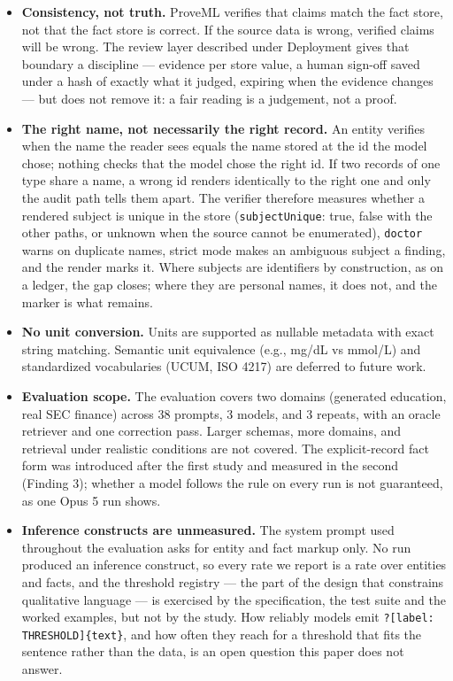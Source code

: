 \documentclass[11pt,a4paper]{article}
\begin{document}
\begin{itemize}[nosep]
    \item \textbf{Consistency, not truth.} ProveML verifies that claims match the fact store, not that the fact store is correct. If the source data is wrong, verified claims will be wrong. The review layer described under Deployment gives that boundary a discipline --- evidence per store value, a human sign-off saved under a hash of exactly what it judged, expiring when the evidence changes --- but does not remove it: a fair reading is a judgement, not a proof.
    \item \textbf{The right name, not necessarily the right record.} An entity verifies when the name the reader sees equals the name stored at the id the model chose; nothing checks that the model chose the right id. If two records of one type share a name, a wrong id renders identically to the right one and only the audit path tells them apart. The verifier therefore measures whether a rendered subject is unique in the store (\texttt{subjectUnique}: true, false with the other paths, or unknown when the source cannot be enumerated), \texttt{doctor} warns on duplicate names, strict mode makes an ambiguous subject a finding, and the render marks it. Where subjects are identifiers by construction, as on a ledger, the gap closes; where they are personal names, it does not, and the marker is what remains.
    \item \textbf{No unit conversion.} Units are supported as nullable metadata with exact string matching. Semantic unit equivalence (e.g., mg/dL vs mmol/L) and standardized vocabularies (UCUM, ISO 4217) are deferred to future work.
    \item \textbf{Evaluation scope.} The evaluation covers two domains (generated education, real SEC finance) across 38 prompts, 3 models, and 3 repeats, with an oracle retriever and one correction pass. Larger schemas, more domains, and retrieval under realistic conditions are not covered. The explicit-record fact form was introduced after the first study and measured in the second (Finding 3); whether a model follows the rule on every run is not guaranteed, as one Opus 5 run shows.
    \item \textbf{Inference constructs are unmeasured.} The system prompt used throughout the evaluation asks for entity and fact markup only. No run produced an inference construct, so every rate we report is a rate over entities and facts, and the threshold registry --- the part of the design that constrains qualitative language --- is exercised by the specification, the test suite and the worked examples, but not by the study. How reliably models emit \texttt{?[label: THRESHOLD]\{text\}}, and how often they reach for a threshold that fits the sentence rather than the data, is an open question this paper does not answer.

\end{itemize}
\end{document}

